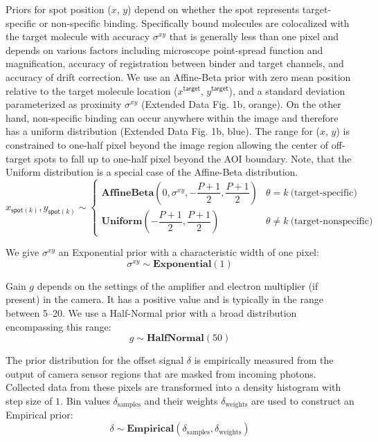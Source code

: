 Priors for spot position ($x$, $y$) depend on whether the spot represents target-specific or non-specific binding. Specifically bound molecules are colocalized with the target molecule with accuracy $\sigma^{xy}$ that is generally less than one pixel and depends on various factors including microscope point-spread function and magnification, accuracy of registration between binder and target channels, and accuracy of drift correction. We use an Affine-Beta prior with zero mean position relative to the target molecule location ($x^\mathsf{target}$, $y^\mathsf{target}$), and a standard deviation parameterized as proximity $\sigma^{xy} $ (Extended Data Fig. 1b, orange). On the other hand, non-specific binding can occur anywhere within the image and therefore has a uniform distribution (Extended Data Fig. 1b, blue).  The range for ($x$, $y$) is constrained to one-half pixel beyond the image region allowing the center of off-target spots to fall up to one-half pixel beyond the AOI boundary. Note, that the Uniform distribution is a special case of the Affine-Beta distribution.
%
\begin{equation}
    x_{\mathsf{spot}(k)}, y_{\mathsf{spot}(k)} \sim
    \begin{cases}
        \mathbf{AffineBeta}\left( 0, \sigma^{xy}, -\dfrac{P+1}{2}, \dfrac{P+1}{2} \right) & \theta = k ~\textrm{(target-specific)} \\
        \mathbf{Uniform}\left(-\dfrac{P+1}{2}, \dfrac{P+1}{2} \right) & \theta \neq k ~\text{(target-nonspecific)}
    \end{cases}
\end{equation}

We give $\sigma^{xy}$ an Exponential prior with a characteristic width of one pixel:
%
\begin{equation}
    \sigma^{xy} \sim \mathbf{Exponential}(1)
\end{equation}

Gain $g$ depends on the settings of the amplifier and electron multiplier (if present) in the camera. It has a positive value and is typically in the range between 5--20. We use a Half-Normal prior with a broad distribution encompassing this range:
%
\begin{equation}
    g \sim \mathbf{HalfNormal}(50)
\end{equation}

The prior distribution for the offset signal $\delta$ is empirically measured from the output of camera sensor regions that are masked from incoming photons. Collected data from these pixels are transformed into a density histogram with step size of $1$. Bin values $\delta_\mathrm{samples}$ and their weights $\delta_\mathrm{weights}$ are used to construct an Empirical prior:
%
\begin{equation}
    \delta \sim \mathbf{Empirical}(\delta_\mathrm{samples}, \delta_\mathrm{weights})
\end{equation}


